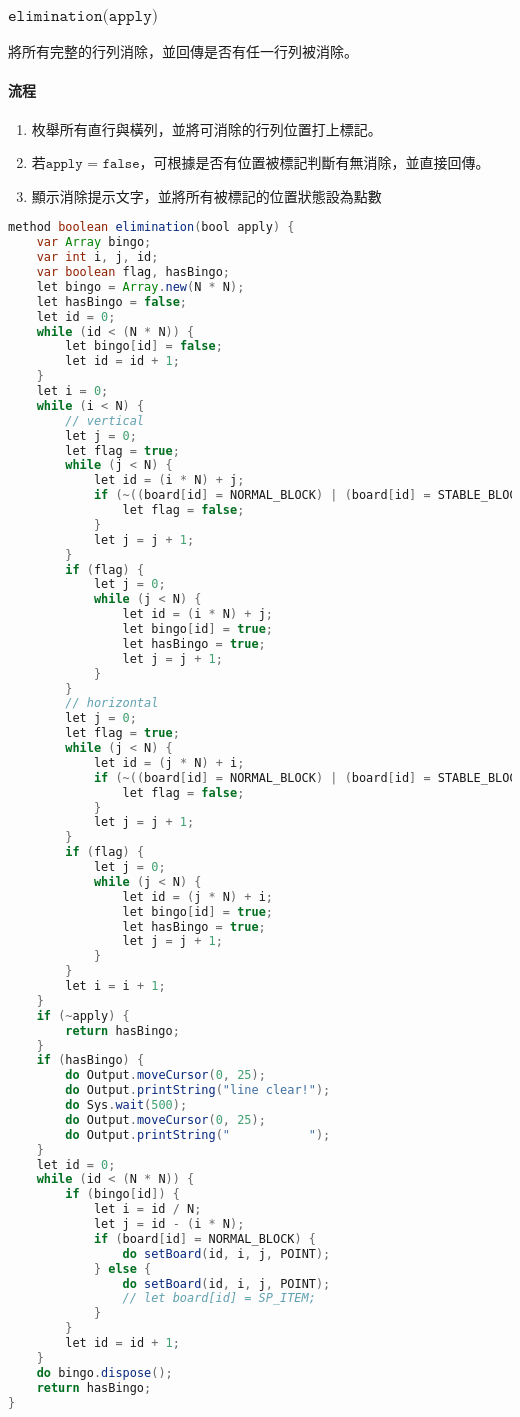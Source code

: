 \documentclass[pstricks, 12pt, a4paper]{article}
\begin{document}
    \subsubsection{$\texttt{elimination(apply)}$}
      將所有完整的行列消除，並回傳是否有任一行列被消除。
      \paragraph{流程}
      \begin{enumerate}
        \item 枚舉所有直行與橫列，並將可消除的行列位置打上標記。
        \item 若$\texttt{apply = false}$，可根據是否有位置被標記判斷有無消除，並直接回傳。
        \item 顯示消除提示文字，並將所有被標記的位置狀態設為點數
      \end{enumerate}
      \begin{lstlisting}[language=Java, frame=single]
method boolean elimination(bool apply) {
    var Array bingo;
    var int i, j, id;
    var boolean flag, hasBingo;
    let bingo = Array.new(N * N);
    let hasBingo = false;
    let id = 0;
    while (id < (N * N)) {
        let bingo[id] = false;
        let id = id + 1;
    }
    let i = 0;
    while (i < N) {
        // vertical
        let j = 0;
        let flag = true;
        while (j < N) {
            let id = (i * N) + j;
            if (~((board[id] = NORMAL_BLOCK) | (board[id] = STABLE_BLOCK))) {
                let flag = false;
            }
            let j = j + 1;
        }
        if (flag) {
            let j = 0;
            while (j < N) {
                let id = (i * N) + j;
                let bingo[id] = true;
                let hasBingo = true;
                let j = j + 1;
            }
        }
        // horizontal
        let j = 0;
        let flag = true;
        while (j < N) {
            let id = (j * N) + i;
            if (~((board[id] = NORMAL_BLOCK) | (board[id] = STABLE_BLOCK))) {
                let flag = false;
            }
            let j = j + 1;
        }
        if (flag) {
            let j = 0;
            while (j < N) {
                let id = (j * N) + i;
                let bingo[id] = true;
                let hasBingo = true;
                let j = j + 1;
            }
        }
        let i = i + 1;
    }
    if (~apply) {
        return hasBingo;
    }
    if (hasBingo) {
        do Output.moveCursor(0, 25);
        do Output.printString("line clear!");
        do Sys.wait(500);
        do Output.moveCursor(0, 25);
        do Output.printString("           ");
    }
    let id = 0;
    while (id < (N * N)) {
        if (bingo[id]) {
            let i = id / N;
            let j = id - (i * N);
            if (board[id] = NORMAL_BLOCK) {
                do setBoard(id, i, j, POINT);
            } else {
                do setBoard(id, i, j, POINT);
                // let board[id] = SP_ITEM;
            }
        }
        let id = id + 1;
    }
    do bingo.dispose();
    return hasBingo;
}
      \end{lstlisting}
\end{document}
